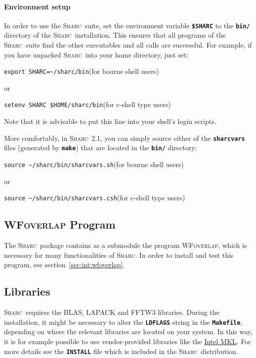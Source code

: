 \documentclass[a4paper,10pt,DIV=15,openany]{scrbook}
\newcommand{\link}[2]{\href{#1}{#2}}
\newcommand{\sharc}{\textsc{Sharc}}
\newcommand{\ttt}[1]{\textbf{\texttt{#1}}}
\newenvironment{example}{
  \setlength{\OuterFrameSep}{3pt}
  \vspace{0mm}
  \definecolor{shadecolor}{HTML}{E4F4FF}
  \begin{shaded}
}{
  \end{shaded}
}
\begin{document}
\paragraph{Environment setup}


In order to use the \sharc\ suite, set the environment variable \ttt{\$SHARC} to the \ttt{bin/} directory of the \sharc\ installation. 
This ensures that all programs of the \sharc\ suite find the other executables and all calls are successful. 
For example, if you have unpacked \sharc\ into your home directory, just set: 
\begin{example}
\verb|export SHARC=~/sharc/bin|\quad (for bourne shell users)
\end{example}
or
\begin{example}
\verb|setenv SHARC $HOME/sharc/bin|\quad (for c-shell type users)
\end{example}
Note that it is advisable to put this line into your shell's login
scripts.

More comfortably, in \sharc~2.1, you can simply source either of the \ttt{sharcvars} files (generated by \ttt{make}) that are located in the \ttt{bin/} directory:
\begin{example}
\verb|source ~/sharc/bin/sharcvars.sh|\quad (for bourne shell users)
\end{example}
or
\begin{example}
\verb|source ~/sharc/bin/sharcvars.csh|\quad (for c-shell type users)
\end{example}



\subsection{\textsc{WFoverlap} Program}

The \sharc\ package contains as a submodule the program \textsc{WFoverlap}, which is necessary for many functionalities of \sharc.
In order to install and test this program, see section~\ref{sec:int:wfoverlap}.

\subsection{Libraries}

\sharc\ requires the BLAS, LAPACK and FFTW3 libraries. During the installation, it might be necessary to alter the \ttt{LDFLAGS} string in the \ttt{Makefile}, depending on where the relevant libraries are located on your system. In this way, it is for example possible to use vendor-provided libraries like the \link{https://software.intel.com/en-us/intel-mkl}{Intel MKL}. For more details see the \ttt{INSTALL} file which is included in the \sharc\ distribution.
\end{document}
